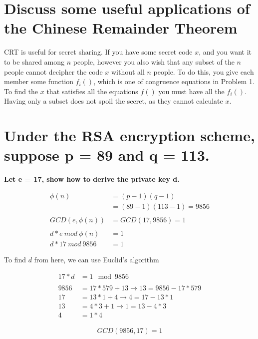 \documentclass[letterpaper]{article}
\begin{document}
\section{Discuss some useful applications of the Chinese Remainder Theorem}

CRT is useful for secret sharing. If you have some secret code \(x\), and you want it to be shared among \(n\) people, however you also wish that any subset of the \(n\) people cannot decipher the code \(x\) without all \(n\) people. To do this, you give each member some function \(f_i()\), which is one of congruence equations in Problem 1. To find the \(x\) that satisfies all the equations \(f()\) you must have all the \(f_i()\). Having only a subset does not spoil the secret, as they cannot calculate \(x\).

\section{Under the RSA encryption scheme, suppose p = 89 and q = 113.}

\textbf{Let e = 17, show how to derive the private key d.}

\begin{equation*}
  \begin{split}
\phi(n) &= (p -1)(q -1) \\
& =(89 - 1)(113 - 1) = 9856 \\
\\
GCD(e, \phi(n)) &= GCD(17, 9856) = 1 \\
\\
d*e\ mod\ \phi(n) &= 1 \\
d*17\ mod\ 9856 &= 1
  \end{split}
\end{equation*}

To find \(d\) from here, we can use Euclid's algorithm

\begin{equation*}
  \begin{split}
17*d &= 1\mod 9856 \\
\\
9856 &= 17*579 + 13 \rightarrow 13 = 9856 - 17*579 \\
17 &= 13*1 + 4 \rightarrow 4  = 17 - 13*1 \\
13 &= 4*3 + 1 \rightarrow 1 = 13 - 4*3 \\
4 &= 1*4
  \end{split}
\end{equation*}

\begin{equation*}
  \begin{split}
GCD(9856, 17) = 1
  \end{split}
\end{equation*}
\end{document}
